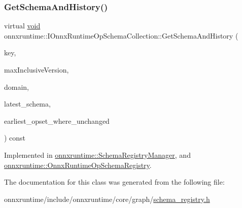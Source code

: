 \mbox{\label{classonnxruntime_1_1IOnnxRuntimeOpSchemaCollection_a9ac69a75ece4f75b614e6b352f8501f0}} 
\subsubsection{\texorpdfstring{Get\+Schema\+And\+History()}{GetSchemaAndHistory()}}
{\footnotesize\ttfamily virtual \mbox{\hyperlink{mlasi_8h_a88f941d423cb2a819b70a1358982b1a6}{void}} onnxruntime\+::\+I\+Onnx\+Runtime\+Op\+Schema\+Collection\+::\+Get\+Schema\+And\+History (\begin{DoxyParamCaption}\item[{const std\+::string \&}]{key,  }\item[{int}]{max\+Inclusive\+Version,  }\item[{const std\+::string \&}]{domain,  }\item[{const O\+N\+N\+X\+\_\+\+N\+A\+M\+E\+S\+P\+A\+C\+E\+::\+Op\+Schema $\ast$$\ast$}]{latest\+\_\+schema,  }\item[{int $\ast$}]{earliest\+\_\+opset\+\_\+where\+\_\+unchanged }\end{DoxyParamCaption}) const\hspace{0.3cm}{\ttfamily [pure virtual]}}



Implemented in \mbox{\hyperlink{classonnxruntime_1_1SchemaRegistryManager_ae323ccc55079bbb8b6fedfd382ec2d30}{onnxruntime\+::\+Schema\+Registry\+Manager}}, and \mbox{\hyperlink{classonnxruntime_1_1OnnxRuntimeOpSchemaRegistry_ab12d5511c6c08e2e38a15513ad921a57}{onnxruntime\+::\+Onnx\+Runtime\+Op\+Schema\+Registry}}.



The documentation for this class was generated from the following file\+:\begin{DoxyCompactItemize}
\item 
onnxruntime/include/onnxruntime/core/graph/\mbox{\hyperlink{schema__registry_8h}{schema\+\_\+registry.\+h}}\end{DoxyCompactItemize}
